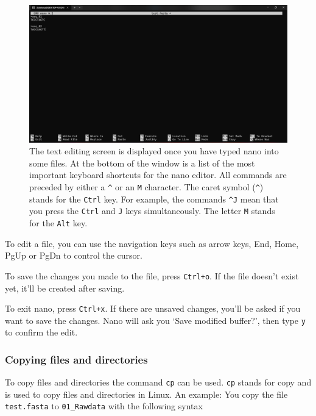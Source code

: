 \documentclass[
  letterpaper,
  DIV=11,
  numbers=noendperiod]{scrreprt}
\begin{document}
\begin{figure}

{\centering \includegraphics{./assets/04_nano_screen.png}

}

\caption{The text editing screen is displayed once you have typed nano
into some files. At the bottom of the window is a list of the most
important keyboard shortcuts for the nano editor. All commands are
preceded by either a \texttt{\^{}} or an \texttt{M} character. The caret
symbol (\texttt{\^{}}) stands for the \texttt{Ctrl} key. For example,
the commands \texttt{\^{}J} mean that you press the \texttt{Ctrl} and
\texttt{J} keys simultaneously. The letter \texttt{M} stands for the
\texttt{Alt} key.}

\end{figure}

To edit a file, you can use the navigation keys such as arrow keys, End,
Home, PgUp or PgDn to control the cursor.

To save the changes you made to the file, press \texttt{Ctrl+o}. If the
file doesn't exist yet, it'll be created after saving.

To exit nano, press \texttt{Ctrl+x}. If there are unsaved changes,
you'll be asked if you want to save the changes. Nano will ask you `Save
modified buffer?', then type \texttt{y} to confirm the edit.

\hypertarget{copying-files-and-directories}{%
\subsubsection*{Copying files and
directories}\label{copying-files-and-directories}}

To copy files and directories the command \texttt{cp} can be used.
\texttt{cp} stands for copy and is used to copy files and directories in
Linux. An example: You copy the file \texttt{test.fasta} to
\texttt{01\_Rawdata} with the following syntax
\end{document}
